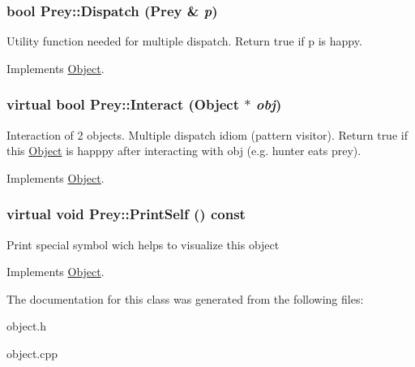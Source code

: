 \hypertarget{classPrey_a1c9491af7144879d4eb0a63e5de4d6b9}{
\subsubsection[{Dispatch}]{\setlength{\rightskip}{0pt plus 5cm}bool Prey::Dispatch ({\bf Prey} \& {\em p})}}
\label{classPrey_a1c9491af7144879d4eb0a63e5de4d6b9}
Utility function needed for multiple dispatch. Return true if p is happy. 

Implements \hyperlink{classObject_a70097e3ad4433aec0dd0b938fcedfeca}{Object}.

\hypertarget{classPrey_a3f46445d442e33d47edcc94bf5f537b4}{
\subsubsection[{Interact}]{\setlength{\rightskip}{0pt plus 5cm}virtual bool Prey::Interact ({\bf Object} $\ast$ {\em obj})}}
\label{classPrey_a3f46445d442e33d47edcc94bf5f537b4}
Interaction of 2 objects. Multiple dispatch idiom (pattern visitor). Return true if this \hyperlink{classObject}{Object} is happpy after interacting with obj (e.g. hunter eats prey). 

Implements \hyperlink{classObject_a27d03e80827229de2ce885a0bc1c83c0}{Object}.

\hypertarget{classPrey_a46d5447bf01e734154f8d3f2f27c8fcd}{
\subsubsection[{PrintSelf}]{\setlength{\rightskip}{0pt plus 5cm}virtual void Prey::PrintSelf () const}}
\label{classPrey_a46d5447bf01e734154f8d3f2f27c8fcd}
Print special symbol wich helps to visualize this object 

Implements \hyperlink{classObject_a2c63e79dfa8626451b4a04b0b72294eb}{Object}.



The documentation for this class was generated from the following files:\begin{DoxyCompactItemize}
\item 
object.h\item 
object.cpp\end{DoxyCompactItemize}
